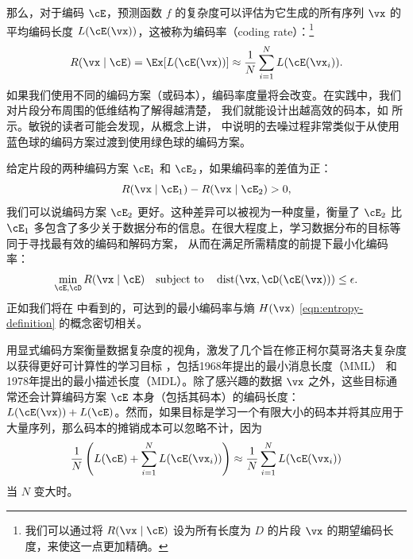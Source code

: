 \documentclass[../../book-main_zh.tex]{subfiles}
\begin{document}
那么，对于编码 \(\cE\)，预测函数 \(f\) 的复杂度可以评估为它生成的所有序列 \(\vx\) 的平均编码长度
\(L(\cE(\vx))\)，这被称为编码率（coding rate）：\footnote{我们可以通过将 \(R(\vx \mid
\cE)\) 设为所有长度为 \(D\) 的片段 \(\vx\) 的期望编码长度，来使这一点更加精确。}
\begin{equation}
    R(\vx \mid \cE) = \Ex[L(\cE(\vx))] \approx \frac{1}{N}\sum_{i=1}^{N}
    L(\cE(\vx_{i})).
    \label{eqn:coding-rate}
\end{equation}
如果我们使用不同的编码方案（或码本），编码率度量将会改变。在实践中，我们对片段分布周围的低维结构了解得越清楚，
我们就能设计出越高效的码本，如
 所示。敏锐的读者可能会发现，从概念上讲，
中说明的去噪过程非常类似于从使用蓝色球的编码方案过渡到使用绿色球的编码方案。

给定片段的两种编码方案 \(\cE_{1}\) 和 \(\cE_{2}\)，如果编码率的差值为正：
\begin{equation}
    R(\vx \mid \cE_{1}) -  R(\vx \mid \cE_{2}) > 0,
\end{equation}
我们可以说编码方案 \(\cE_{2}\) 更好。这种差异可以被视为一种度量，衡量了 \(\cE_{2}\) 比 \(\cE_{1}\)
多包含了多少关于数据分布的信息。在很大程度上，学习数据分布的目标等同于寻找最有效的编码和解码方案，
从而在满足所需精度的前提下最小化编码率：
\begin{equation}
    \min_{\cE, \cD} R(\vx \mid \cE) \quad \text{subject to} \quad
    \operatorname{dist}(\vx, \cD(\cE(\vx))) \leq \epsilon.
\end{equation}
正如我们将在  中看到的，可达到的最小编码率与熵 \(H(\vx)\)
\eqref{eqn:entropy-definition} 的概念密切相关。

\begin{remark}\label{rem:computable-complexity}
    用显式编码方案衡量数据复杂度的视角，激发了几个旨在修正柯尔莫哥洛夫复杂度以获得更好可计算性的学习目标
    \cite{WallaceC1999}，包括1968年提出的最小消息长度（MML）\cite{WallaceC1968}
    和1978年提出的最小描述长度（MDL）\cite{Rissanen-1978,HansenM2001}。除了感兴趣的数据
    \(\vx\) 之外，这些目标通常还会计算编码方案 \(\cE\) 本身（包括其码本）的编码长度：\(L(\cE(\vx)) +
    L(\cE)\)。然而，如果目标是学习一个有限大小的码本并将其应用于大量序列，那么码本的摊销成本可以忽略不计，因为
    \begin{equation}
        \frac{1}{N}\left( L(\cE) + \sum_{i=1}^{N}
        L(\cE(\vx_{i}))\right) \approx \frac{1}{N}\sum_{i=1}^{N} L(\cE(\vx_{i}))
    \end{equation}
    当 \(N\) 变大时。
\end{remark}
\end{document}
